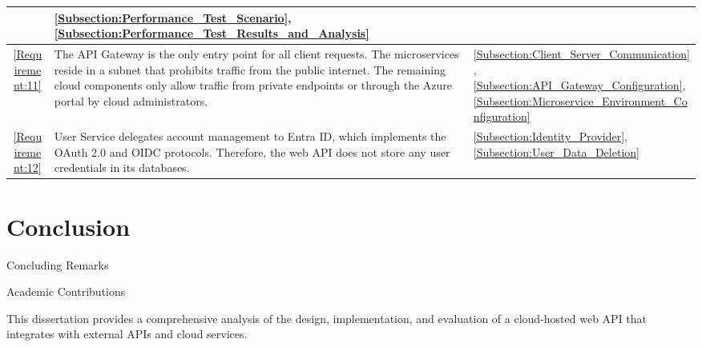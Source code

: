 \documentclass[12pt, reqno]{amsbook}
\makeatletter
\def\section{\@startsection{section}{1}%
      \z@{.5\linespacing\@plus.7\linespacing}{.25\linespacing}%
      {\normalfont\bfseries\flushleft}}
\theoremstyle{definition}
\theoremstyle{definition}
\numberwithin{section}{chapter}
\numberwithin{table}{chapter}
\numberwithin{figure}{chapter}
\makeatother
\begin{document}
\begin{longtable}{|c|m{280pt}|M{65pt}|}
   & \ref{Subsection:Performance_Test_Scenario}, \ref{Subsection:Performance_Test_Results_and_Analysis}                                                                                                                                                                                        \\
  \hline
  \ref{Requirement:11}
   & The \ac{API} Gateway is the only entry point for all client requests. The microservices reside in a subnet that prohibits traffic from the public internet. The remaining cloud components only allow traffic from private endpoints or through the Azure portal by cloud administrators.
   & \ref{Subsection:Client_Server_Communication}, \ref{Subsection:API_Gateway_Configuration}, \ref{Subsection:Microservice_Environment_Configuration}                                                                                                                                         \\
  \hline
  \ref{Requirement:12}
   & User Service delegates account management to Entra ID, which implements the \ac{OAuth} 2.0 and \ac{OIDC} protocols. Therefore, the web \ac{API} does not store any user credentials in its databases.
   & \ref{Subsection:Identity_Provider}, \ref{Subsection:User_Data_Deletion}                                                                                                                                                                                                                   \\
\end{longtable}
\endgroup


\chapter{Conclusion}
\label{Chapter:Conclusion}

\section{Concluding Remarks}
\label{Section:Concluding_Remarks}

\section{Academic Contributions}
\label{Section:Academic_Contributions}

This dissertation provides a comprehensive analysis of the design, implementation, and evaluation of a cloud-hosted web \ac{API} that integrates with external \acp{API} and cloud services.
\end{document}

